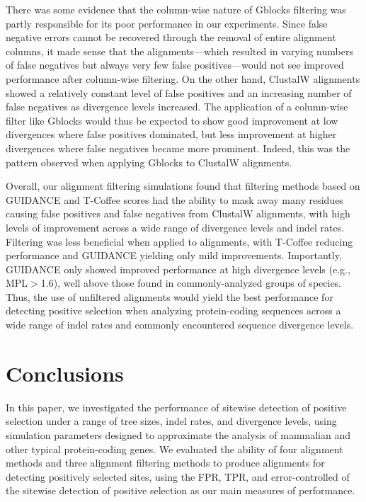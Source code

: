 \documentclass{article}
\begin{document}
There was some evidence that the column-wise nature of Gblocks
filtering was partly responsible for its poor performance in our
experiments. Since false negative errors cannot be recovered through
the removal of entire alignment columns, it made sense that the
\prankc alignments---which resulted in varying numbers of false
negatives but always very few false positives---would not see improved
performance after column-wise filtering. On the other hand, ClustalW
alignments showed a relatively constant level of false positives and
an increasing number of false negatives as divergence levels
increased. The application of a column-wise filter like Gblocks would
thus be expected to show good improvement at low divergences where
false positives dominated, but less improvement at higher divergences
where false negatives became more prominent. Indeed, this was the
pattern observed when applying Gblocks to ClustalW alignments.

Overall, our alignment filtering simulations found that filtering
methods based on GUIDANCE and T-Coffee scores had the ability to mask
away many residues causing false positives and false negatives from
ClustalW alignments, with high levels of improvement across a wide
range of divergence levels and indel rates. Filtering was less
beneficial when applied to \prankc alignments, with T-Coffee reducing
performance and GUIDANCE yielding only mild \tpr
improvements. Importantly, GUIDANCE only showed improved performance
at high divergence levels (e.g., MPL$>$1.6), well above those found in
commonly-analyzed groups of species. Thus, the use of unfiltered
\prankc alignments would yield the best performance for detecting \sw
positive selection when analyzing protein-coding sequences across a
wide range of indel rates and commonly encountered sequence divergence
levels.

\section*{Conclusions}

In this paper, we investigated the performance of sitewise detection
of positive selection under a range of tree sizes, indel rates, and
divergence levels, using simulation parameters designed to approximate
the analysis of mammalian and other typical protein-coding genes. We
evaluated the ability of four alignment methods and three alignment
filtering methods to produce alignments for detecting positively
selected sites, using the FPR, TPR, and error-controlled \tpr of the
sitewise detection of positive selection as our main measures of
performance.
\end{document}
